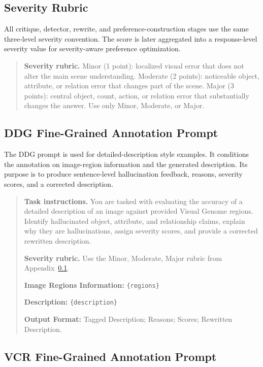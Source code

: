 \documentclass{article}
\begin{document}
\subsection{Severity Rubric}
\label{app:severity-rubric}

All critique, detector, rewrite, and preference-construction stages use the same three-level severity convention. The score is later aggregated into a response-level severity value for severity-aware preference optimization.

\begin{quote}
\small
\textbf{Severity rubric.}
Minor (1 point): localized visual error that does not alter the main scene understanding.
Moderate (2 points): noticeable object, attribute, or relation error that changes part of the scene.
Major (3 points): central object, count, action, or relation error that substantially changes the answer.
Use only Minor, Moderate, or Major.
\end{quote}

\subsection{DDG Fine-Grained Annotation Prompt}
\label{app:ddg-prompt}

The DDG prompt is used for detailed-description style examples. It conditions the annotation on image-region information and the generated description. Its purpose is to produce sentence-level hallucination feedback, reasons, severity scores, and a corrected description.

\begin{quote}
\small
\textbf{Task instructions.}
You are tasked with evaluating the accuracy of a detailed description of an image against provided Visual Genome regions. Identify hallucinated object, attribute, and relationship claims, explain why they are hallucinations, assign severity scores, and provide a corrected rewritten description.

\textbf{Severity rubric.}
Use the Minor, Moderate, Major rubric from Appendix~\ref{app:severity-rubric}.

\textbf{Image Regions Information:}
\texttt{\{regions\}}

\textbf{Description:}
\texttt{\{description\}}

\textbf{Output Format:}
Tagged Description;
Reasons;
Scores;
Rewritten Description.
\end{quote}

\subsection{VCR Fine-Grained Annotation Prompt}
\label{app:vcr-prompt}
\end{document}
